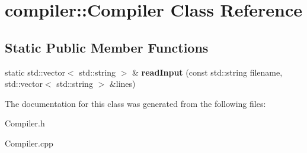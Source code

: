\hypertarget{classcompiler_1_1Compiler}{}\section{compiler\+:\+:Compiler Class Reference}
\label{classcompiler_1_1Compiler}
\subsection*{Static Public Member Functions}
\begin{DoxyCompactItemize}
\item 
\mbox{\label{classcompiler_1_1Compiler_a2a85a340df63a75f8fcd727c984b7ec4}} 
static std\+::vector$<$ std\+::string $>$ \& {\bfseries read\+Input} (const std\+::string filename, std\+::vector$<$ std\+::string $>$ \&lines)
\end{DoxyCompactItemize}


The documentation for this class was generated from the following files\+:\begin{DoxyCompactItemize}
\item 
Compiler.\+h\item 
Compiler.\+cpp\end{DoxyCompactItemize}
